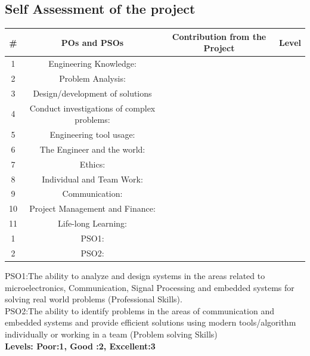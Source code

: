 
\begin{appendices}
\chapter{Self Assessment of the project}
{\begin{table}[h]
\begin{tabular}{|c|c|c|c|}
\hline 
{\#}&{\bf POs and PSOs} & {\bf Contribution from the Project}&{\bf Level} \\ \hline
1&Engineering Knowledge:
 & & \\ \hline
2&Problem Analysis:&&\\ \hline
3&Design/development of solutions &&\\ \hline
4&Conduct investigations of complex problems: &&\\ \hline
5&
Engineering tool usage: &&\\ \hline
6&The Engineer and the world:
&&\\ \hline
7&
Ethics: &&\\ \hline
8&
Individual and Team Work: &&\\ \hline
9&
Communication:&&\\ \hline
10&
Project Management and Finance:&&\\ \hline
11&
Life-long Learning: &&\\ \hline
1&
PSO1: &&\\ \hline
2&
PSO2: &&\\ \hline
\end{tabular}
\end{table}}
PSO1:The ability to analyze and design systems in the areas related to microelectronics, Communication, Signal Processing and embedded systems for solving real world problems (Professional Skills).\\
PSO2:The ability to identify problems in the areas of communication and embedded systems and provide efficient solutions using modern tools/algorithm individually or working in a team (Problem solving Skills)
 \\ {\bf Levels: Poor:1, Good :2, Excellent:3}

\end{appendices}
